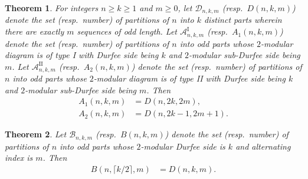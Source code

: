 \documentclass[11pt,reqno]{amsart}
\numberwithin{equation}{section}
\theoremstyle{plain}
\newtheorem{theorem}{Theorem}[section]
\theoremstyle{definition}
\theoremstyle{named}
\def\cD{\mathcal{D}}
\def\Ao{\mathcal{A}^{\mathrm{I}}}
\def\A2{\mathcal{A}^{\mathrm{II}}}
\def\cB{\mathcal{B}}
\begin{document}
\begin{theorem}\label{thm:ref-d}
For integers $n\ge k\ge 1$ and $m\ge 0$, let $\cD_{n,k,m}$ (resp.~$D(n,k,m)$) denote the set (resp.~number) of partitions of $n$ into $k$ distinct parts wherein there are exactly $m$ sequences of odd length. Let 
$\Ao_{n,k,m}$ (resp.~$A_1(n,k,m)$) denote the set (resp.~number) of partitions of $n$ into odd parts whose $2$-modular diagram is of type I with Durfee side being $k$ and $2$-modular sub-Durfee side being $m$. Let $\A2_{n,k,m}$ (resp.~$A_2(n,k,m)$) denote the set (resp.~number) of partitions of $n$ into odd parts whose $2$-modular diagram is of type II with Durfee side being $k$ and $2$-modular sub-Durfee side being $m$. Then
\begin{align*}
A_1(n,k,m) &= D(n,2k,2m),\\
A_2(n,k,m) &= D(n,2k-1,2m+1).
\end{align*}
\end{theorem}

\begin{theorem}\label{thm:ref-alt}
Let $\cB_{n,k,m}$ (resp.~$B(n,k,m)$) denote the set (resp.~number) of partitions of $n$ into odd parts whose $2$-modular Durfee side is $k$ and alternating index is $m$. Then
\begin{align*}
B(n,\lceil k/2\rceil,m) &= D(n,k,m).
\end{align*}
\end{theorem}
\end{document}
